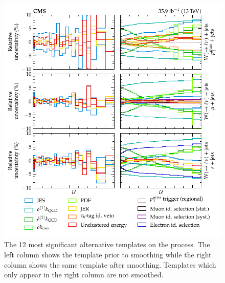 \begin{figure}[htb]
    \centering
    \includegraphics{appendices/100_appendices/images/alt_templates_bkg.pdf}
    \caption{
        The 12 most significant alternative templates on the \IWj process. The left column shows the template prior to smoothing while the right column shows the same template after smoothing. Templates which only appear in the right column are not smoothed.
    }
    \label{fig:alt_templates_bkg}
\end{figure}

